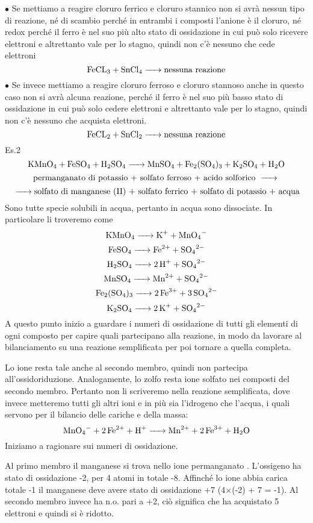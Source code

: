 $\bullet$ Se mettiamo a reagire cloruro ferrico  e cloruro stannico  non si avrà nessun tipo di reazione, né di scambio perché in entrambi i composti l'anione è il cloruro, né redox perché il ferro è nel suo più alto stato di ossidazione in cui può solo ricevere elettroni e altrettanto vale per lo stagno, quindi non c'è nessuno che cede elettroni
$$\ce{FeCL_3 +  SnCl_4 ->}\text{nessuna reazione}$$
$\bullet$ Se invece mettiamo a reagire cloruro ferroso  e cloruro stannoso  anche in questo caso non si avrà alcuna reazione, perché il ferro è nel suo più basso stato di ossidazione in cui può solo cedere elettroni e altrettanto vale per lo stagno, quindi non c'è nessuno che acquista elettroni.
$$\ce{FeCL_2 + SnCl_2 ->}\text{nessuna reazione}$$
Es.2
$$\ce{KMnO_4 + FeSO_4 + H_2SO_4 -> MnSO_4 + Fe_2(SO_4)_3 + K_2SO_4 + H_2O}$$
$$\text{permanganato di potassio + solfato ferroso + acido solforico \ce{->}}$$
$$\ce{->}\text{solfato di manganese (II) + solfato ferrico + solfato di potassio + acqua}$$
Sono tutte specie solubili in acqua, pertanto in acqua sono dissociate. In particolare li troveremo come
$$\ce{KMnO_4 -> K^+ + MnO_4^-}$$
$$\ce{FeSO_4 -> Fe^{2+} + SO_4^{2-}}$$
$$\ce{H_2SO_4 -> 2 H^+ + SO_4^{2-}}$$
$$\ce{MnSO_4 -> Mn^{2+} + SO_4^{2-}}$$
$$\ce{Fe_2(SO_4)_3 -> 2 Fe^{3+} + 3 SO_4^{2-}}$$
$$\ce{K_2SO_4 -> 2 K^+ + SO_4^{2-}}$$
A questo punto inizio a guardare i numeri di ossidazione di tutti gli elementi di ogni composto per capire quali partecipano alla reazione, in modo da lavorare al bilanciamento su una reazione semplificata per poi tornare a quella completa.

Lo ione  resta tale anche al secondo membro, quindi non partecipa all'ossidoriduzione. Analogamente, lo zolfo resta ione solfato  nei composti del secondo membro. Pertanto non li scriveremo nella reazione semplificata, dove invece metteremo tutti gli altri ioni e in più sia l'idrogeno  che l'acqua, i quali servono per il bilancio delle cariche e della massa:
$$\ce{MnO_4- + 2Fe^2+ + H+ -> Mn^2+ + 2Fe^3+ + H_2O}$$
Iniziamo a ragionare sui numeri di ossidazione.

Al primo membro il manganese si trova nello ione permanganato . L'ossigeno ha stato di ossidazione -2, per 4 atomi in totale -8. Affinché lo ione abbia carica totale -1 il manganese deve avere stato di ossidazione +7 (4$\times$(-2) + 7 = -1). Al secondo membro invece ha n.o. pari a +2, ciò significa che ha acquistato 5 elettroni e quindi si è ridotto.

